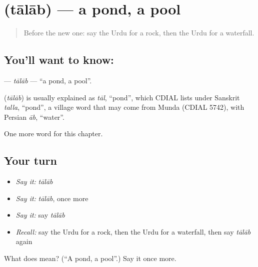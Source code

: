 \section[\texorpdfstring{\ur{تالاب} (tālāb)}{تالاب (tālāb)}]{ (tālāb) — a pond, a pool}

\label{lesson:UR-C124-talab}



\begin{quote}
Before the new one: say the Urdu for a rock, then the Urdu for a waterfall.
\end{quote}

\subsection*{You'll want to know: }
\textbf{} — \emph{tālāb} — \textquotedblleft{}a pond, a pool\textquotedblright{}.

\begin{cousinweb}
\textbf{} (\emph{tālāb}) is usually explained as \emph{tāl}, \textquotedblleft{}pond\textquotedblright{}, which CDIAL lists under Sanskrit \emph{talla}, \textquotedblleft{}pond\textquotedblright{}, a village word that may come from Munda (CDIAL 5742), with Persian \emph{āb}, \textquotedblleft{}water\textquotedblright{}.
\end{cousinweb}

\begin{grammarlens}[title={What you've built}]
One more word for this chapter.
\end{grammarlens}

\subsection*{Your turn}
\begin{itemize}
\raggedright
  \item \emph{Say it:} \emph{tālāb}
  \item \emph{Say it:} \emph{tālāb}, once more
  \item \emph{Say it:} say \emph{tālāb}
  \item \emph{Recall:} say the Urdu for a rock, then the Urdu for a waterfall, then say \emph{tālāb} again
\end{itemize}

\begin{tcolorbox}[breakable,colback=teal!4,colframe=teal!35!black,title={Before you move on}]
What does  mean? (\textquotedblleft{}A pond, a pool\textquotedblright{}.) Say it once more.
\end{tcolorbox}
